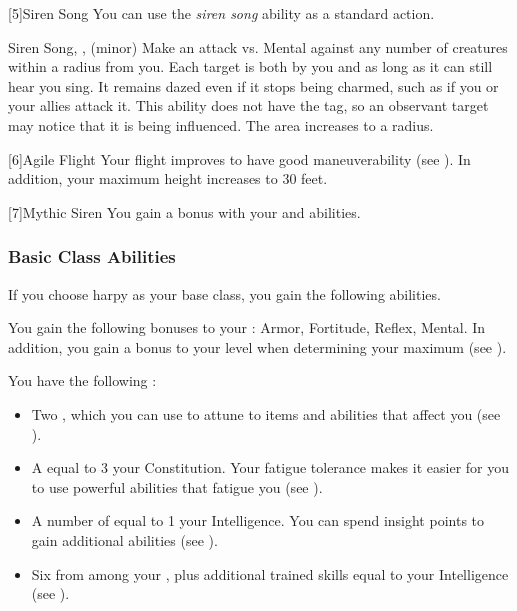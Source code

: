             [5]{Siren Song} You can use the \textit{siren song} ability as a standard action.
            \begin{magicalsustainability}{Siren Song}{, ,  (minor)}
                \rankline
                Make an attack vs. Mental against any number of creatures within a \medarea radius from you.
                \hit Each target is both \charmed by you and \dazed as long as it can still hear you sing.
                It remains dazed even if it stops being charmed, such as if you or your allies attack it.
                This ability does not have the  tag, so an observant target may notice that it is being influenced.
                \rankline
                 The area increases to a \largearea radius.
            \end{magicalsustainability}

            [6]{Agile Flight} Your flight improves to have good maneuverability (see ).
            In addition, your maximum height increases to 30 feet.

            [7]{Mythic Siren} You gain a   bonus with your  and  abilities.

        \subsubsection{Basic Class Abilities}
            If you choose harpy as your base class, you gain the following abilities.

            You gain the following bonuses to your :  Armor,  Fortitude,  Reflex,  Mental.
            In addition, you gain a  bonus to your level when determining your maximum  (see ).

             You have the following :
            \begin{itemize}
                \item Two , which you can use to attune to items and abilities that affect you (see ).
                \item A  equal to 3 \add your Constitution.
                    Your fatigue tolerance makes it easier for you to use powerful abilities that fatigue you (see ).
                \item A number of  equal to 1 \add your Intelligence.
                    You can spend insight points to gain additional abilities (see ).
                \item Six  from among your , plus additional trained skills equal to your Intelligence (see ).
            \end{itemize}


